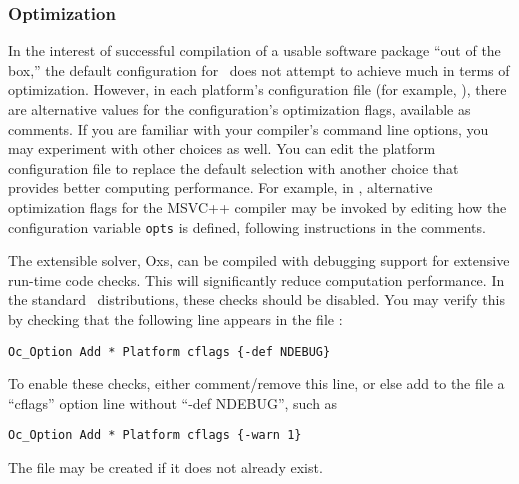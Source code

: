 \subsubsection{Optimization}\label{sec:optimize}

In the interest of successful compilation of a usable software package
``out of the box,'' the default configuration for \OOMMF\ does not
attempt to achieve much in terms of optimization.  However, in each
platform's configuration file (for example,
), there are alternative values for the
configuration's optimization flags, available as comments.  If you are
familiar with your compiler's command line options, you may experiment
with other choices as well.  You can edit the platform configuration
file to replace the default selection with another choice that
provides better computing performance.  For example, in
, alternative optimization flags for the
MSVC++ compiler may be invoked by editing how the configuration
variable {\tt opts} is defined, following instructions in the comments.

The extensible solver, Oxs, can be compiled with debugging support
for extensive run-time code checks.  This will significantly reduce
computation performance.  In the standard \OOMMF\ distributions, these
checks should be disabled.  You may verify this by checking that
the following line appears in the file :
\begin{verbatim}
Oc_Option Add * Platform cflags {-def NDEBUG}
\end{verbatim}
To enable these checks, either comment/remove this line, or else add 
to the  file a ``cflags'' option line
without ``-def NDEBUG'', such as
\begin{verbatim}
Oc_Option Add * Platform cflags {-warn 1}
\end{verbatim}
The  file may be created if it does not
already exist.

